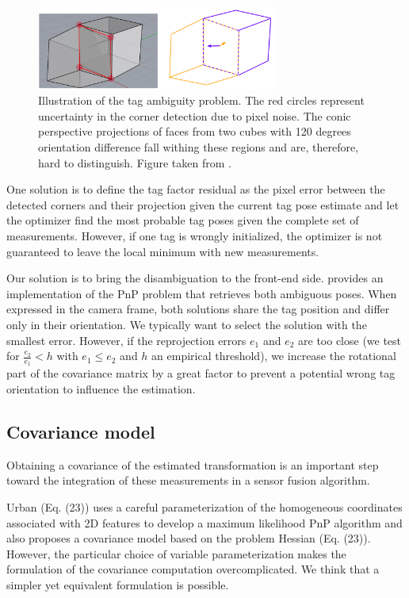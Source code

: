 \begin{figure}
    \centering
    \includegraphics[width=0.7\textwidth]{figures/tag_ambiguity.png}
    \caption{Illustration of the tag ambiguity problem. The red circles represent uncertainty in the corner detection due to pixel noise. 
    The conic perspective projections of faces from two cubes with 120 degrees orientation difference fall withing these regions and are, therefore, 
    hard to distinguish. Figure taken from \cite{8206468}.}
    \label{fig:tag_ambiguity}
\end{figure}

One solution is to define the tag factor residual as the pixel error between the detected corners and their projection given the
current tag pose estimate and let the optimizer find the most probable tag poses given the complete set of measurements. However, if one tag is wrongly initialized, 
the optimizer is not guaranteed to leave the local minimum with new measurements. 

Our solution is to bring the disambiguation to the front-end side.
\cite{collins2014infinitesimal} provides an implementation of the PnP problem that retrieves both ambiguous poses. When expressed in the camera frame, 
both solutions share the tag position and differ only in their orientation. We typically want to select the solution with the smallest error. 
However, if the reprojection errors $e_1$ and $e_2$ are too close (we test for $\tfrac{e_2}{e_1} < h$ with $e_1 \leq e_2$ and $h$ an empirical threshold), 
we increase the rotational part of the covariance matrix by a great factor to prevent a potential wrong tag orientation to influence the estimation.



\subsection{Covariance model}
Obtaining a covariance of the estimated transformation is an important step toward the integration of these measurements in a sensor fusion algorithm.

Urban \cite{urban2016mlpnp} (Eq. (23)) uses a careful parameterization of the homogeneous coordinates associated with 2D features to develop
a maximum likelihood PnP algorithm and also proposes a covariance model based on the problem Hessian (Eq. (23)).  However, the particular choice of variable 
parameterization makes the formulation of the covariance computation overcomplicated.
We think that a simpler yet equivalent formulation is possible. 

